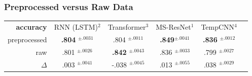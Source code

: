 \begin{frame}
\frametitle{Preprocessed versus Raw Data}

%
{
\centering


\begin{tabular}{rccccc}
	\toprule
	\textbf{accuracy} & RNN (LSTM)$^2$ & Transformer$^3$ & MS-ResNet$^1$ & TempCNN$^4$ \\
	\cmidrule(lr){2-2}\cmidrule(lr){3-3} \cmidrule(lr){4-4}\cmidrule(lr){5-5}
	preprocessed & \textbf{.804} $^{\pm.0031}$ & .804 $^{\pm.0011}$ & \textbf{.849}$^{\pm .0041}$ & \textbf{.836} $^{\pm .0012}$ \\
	raw & .801 $^{\pm .0026}$ & \textbf{.842} $^{\pm .0043}$ & {.836} $^{\pm .0033}$ & .799 $^{\pm .0027}$ \\
	\midrule
	$\Delta$ & .003 $^{\pm .0041}$ & -.038 $^{\pm .0045}$ & .013 $^{\pm .0055}$ & .038 $^{\pm .0029}$ \\
	
	\bottomrule
\end{tabular}
\vspace{1em}

}
\end{frame}
